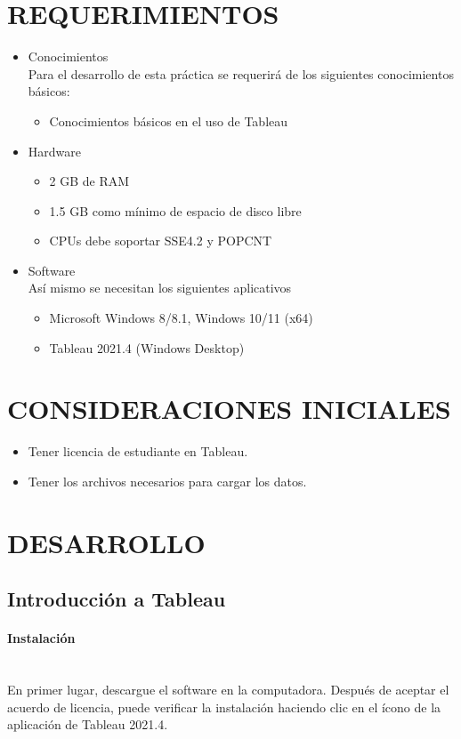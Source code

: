 \documentclass[12pt,letterpaper]{article}
\begin{document}
    \section{REQUERIMIENTOS}
    \begin{itemize}
        \item Conocimientos\\
        Para el desarrollo de esta práctica se requerirá de los siguientes conocimientos básicos:
        \begin{itemize} 
            \item Conocimientos básicos en el uso de Tableau
        \end{itemize}
        \item Hardware
        \begin{itemize}
            \item 2 GB de RAM
            \item 1.5 GB como mínimo de espacio de disco libre
            \item CPUs debe soportar SSE4.2 y POPCNT
        \end{itemize}
        \item Software\\
        Así mismo se necesitan los siguientes aplicativos
        \begin{itemize}
            \item Microsoft Windows 8/8.1, Windows 10/11 (x64)
            \item Tableau 2021.4 (Windows Desktop)
        \end{itemize}
    \end{itemize}
    \section{CONSIDERACIONES INICIALES}
    \begin{itemize}
        \item Tener licencia de estudiante en Tableau.
        \item Tener los archivos necesarios para cargar los datos.
    \end{itemize}
    \newpage
    \section{DESARROLLO}
    \subsection{Introducción a Tableau}
    \paragraph{\large Instalación \\ \\}
    En primer lugar, descargue el software en la computadora. Después de aceptar el acuerdo de licencia, puede verificar la instalación haciendo clic en el ícono de la aplicación de Tableau 2021.4.
\end{document}
